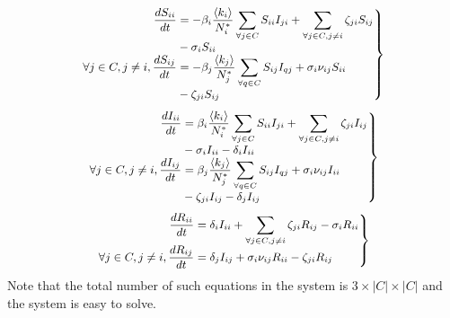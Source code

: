 \documentclass[review]{elsarticle}
\begin{document}
\begin{eqnarray}\label{eq:N_SimpleSIRVincent1}
    \small
    \left.\begin{matrix}\begin{aligned}
        \frac{d S_{ii}}{dt}&=-\beta_{i}\frac{\langle k_{i} \rangle}{N_{i}^{*}}\sum_{\forall j \in C}S_{ii}I_{ji}+\sum_{\forall j\in C, j\neq i}\zeta_{ji}S_{ij}\\
        & - \sigma_{i}S_{ii}\\
        \forall j\in C,j\neq i, \frac{d S_{ij}}{dt}&=-\beta_{j}\frac{\langle k_{j} \rangle}{N_{j}^{*}}\sum_{\forall q \in C}S_{ij}I_{qj}+\sigma_{i}\nu_{ij}S_{ii}\\
        & -\zeta_{ji}S_{ij}
    \end{aligned}\end{matrix}\right\}
\end{eqnarray}
\begin{eqnarray}\label{eq:N_SimpleSIRVincent2}
    \small
    \left.\begin{matrix}\begin{aligned}
        \frac{d I_{ii}}{dt}&=\beta_{i}\frac{\langle k_{i} \rangle}{N_{i}^{*}}\sum_{\forall j \in C}S_{ii}I_{ji}+\sum_{\forall j \in C, j\neq i}\zeta_{ji}I_{ij}\\
        & - \sigma_{i}I_{ii} - \delta_{i}I_{ii}\\
        \forall j\in C,j\neq i, \frac{d I_{ij}}{dt}&=\beta_{j}\frac{\langle k_{j} \rangle}{N_{j}^{*}}\sum_{\forall q \in C}S_{ij}I_{qj}+\sigma_{i}\nu_{ij}I_{ii}\\
        & -\zeta_{ji}I_{ij} - \delta_{j}I_{ij}
    \end{aligned}\end{matrix}\right\}
\end{eqnarray}
\begin{eqnarray}\label{eq:N_SimpleSIRVincent3}
    \small
    \left.\begin{matrix}\begin{aligned}
        \frac{d R_{ii}}{dt}&=\delta_{i}I_{ii}+\sum_{\forall j \in C, j\neq i}\zeta_{ji}R_{ij} - \sigma_{i}R_{ii}\\
        \forall j\in C,j\neq i, \frac{d R_{ij}}{dt}&=\delta_{j}I_{ij}+ \sigma_{i}\nu_{ij}R_{ii} -\zeta_{ji}R_{ij}
    \end{aligned}\end{matrix}\right\}
\end{eqnarray}
Note that the total number of such equations in the system is $3\times |C| \times |C|$ and the system is easy to solve.
\end{document}
